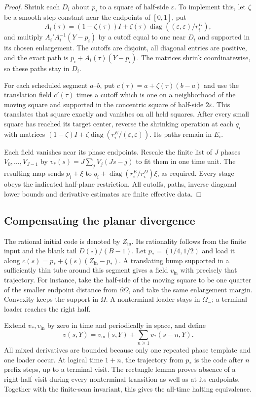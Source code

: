 \begin{proof}
Shrink each $D_i$ about $p_i$ to a square of half-side $\varepsilon$. To implement this, let $\zeta$ be a smooth step constant near the endpoints of $[0,1]$, put
\[
 A_i(\tau)=(1-\zeta(\tau))I+
       \zeta(\tau)\operatorname{diag}((\varepsilon,\varepsilon)/r_i^D),
\]
and multiply $A_i'A_i^{-1}(Y-p_i)$ by a cutoff equal to one near $D_i$ and supported in its chosen enlargement. The cutoffs are disjoint, all diagonal entries are positive, and the exact path is $p_i+A_i(\tau)(Y-p_i)$. The matrices shrink coordinatewise, so these paths stay in $D_i$.

For each scheduled segment $a$--$b$, put $c(\tau)=a+\zeta(\tau)(b-a)$ and use the translation field $c'(\tau)$ times a cutoff which is one on a neighborhood of the moving square and supported in the concentric square of half-side $2\varepsilon$. This translates that square exactly and vanishes on all held squares. After every small square has reached its target center, reverse the shrinking operation at each $q_i$ with matrices $(1-\zeta)I+\zeta\operatorname{diag}(r_i^E/(\varepsilon,\varepsilon))$. Its paths remain in $E_i$.

Each field vanishes near its phase endpoints. Rescale the finite list of $J$ phases $V_0,\ldots,V_{J-1}$ by $v_*(s)=J\sum_jV_j(Js-j)$ to fit them in one time unit. The resulting map sends $p_i+\xi$ to $q_i+\operatorname{diag}(r_i^E/r_i^D)\xi$, as required. Every stage obeys the indicated half-plane restriction. All cutoffs, paths, inverse diagonal lower bounds and derivative estimates are finite effective data.
\end{proof}

\subsection{Compensating the planar divergence}
The rational initial code is denoted by $Z_{\mathrm{in}}$. Its rationality follows from the finite input and the blank tail $D(\square)/(B-1)$. Let $p_*=(1/4,1/2)$ and load it along
$c(s)=p_*+\zeta(s)(Z_{\mathrm{in}}-p_*)$.
A translating bump supported in a sufficiently thin tube around this segment gives a field $v_{\mathrm{in}}$ with precisely that trajectory. For instance, take the half-side of the moving square to be one quarter of the smaller endpoint distance from $\partial\Omega$, and take the same enlargement margin. Convexity keeps the support in $\Omega$. A nonterminal loader stays in $\Omega_-$; a terminal loader reaches the right half.

Extend $v_*,v_{\mathrm{in}}$ by zero in time and periodically in space, and define
\[
 v(s,Y)=v_{\mathrm{in}}(s,Y)+\sum_{n\ge1}v_*(s-n,Y).
\]
All mixed derivatives are bounded because only one repeated phase template and one loader occur. At logical time $1+n$, the trajectory from $p_*$ is the code after $n$ prefix steps, up to a terminal visit. The rectangle lemma proves absence of a right-half visit during every nonterminal transition as well as at its endpoints. Together with the finite-scan invariant, this gives the all-time halting equivalence.

